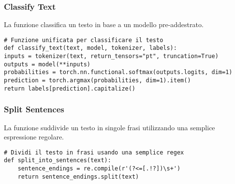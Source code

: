 \documentclass[12pt]{article}
\begin{document}
		\subsubsection{Classify Text}
La funzione classifica un testo in base a un modello pre-addestrato.
	\begin{lstlisting}
# Funzione unificata per classificare il testo
def classify_text(text, model, tokenizer, labels):
inputs = tokenizer(text, return_tensors="pt", truncation=True)
outputs = model(**inputs)
probabilities = torch.nn.functional.softmax(outputs.logits, dim=1)
prediction = torch.argmax(probabilities, dim=1).item()
return labels[prediction].capitalize()	
	\end{lstlisting}
	
		\subsubsection{Split Sentences}
	La funzione suddivide un testo in singole frasi utilizzando una semplice espressione regolare.
	\begin{lstlisting}
# Dividi il testo in frasi usando una semplice regex
def split_into_sentences(text):
	sentence_endings = re.compile(r'(?<=[.!?])\s+')
	return sentence_endings.split(text)
	\end{lstlisting}
	
\end{document}
